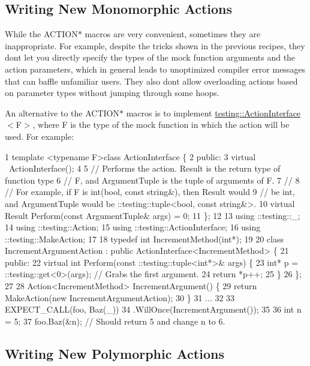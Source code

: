 \subsection*{Writing New Monomorphic Actions}

While the {\ttfamily A\+C\+T\+I\+O\+N$\ast$} macros are very convenient, sometimes they are inappropriate. For example, despite the tricks shown in the previous recipes, they don\textquotesingle{}t let you directly specify the types of the mock function arguments and the action parameters, which in general leads to unoptimized compiler error messages that can baffle unfamiliar users. They also don\textquotesingle{}t allow overloading actions based on parameter types without jumping through some hoops.

An alternative to the {\ttfamily A\+C\+T\+I\+O\+N$\ast$} macros is to implement {\ttfamily \hyperlink{classtesting_1_1_action_interface}{testing\+::\+Action\+Interface}$<$F$>$}, where {\ttfamily F} is the type of the mock function in which the action will be used. For example\+:


\begin{DoxyCode}
1 template <typename F>class ActionInterface \{
2  public:
3   virtual ~ActionInterface();
4 
5   // Performs the action.  Result is the return type of function type
6   // F, and ArgumentTuple is the tuple of arguments of F.
7   //
8   // For example, if F is int(bool, const string&), then Result would
9   // be int, and ArgumentTuple would be ::testing::tuple<bool, const string&>.
10   virtual Result Perform(const ArgumentTuple& args) = 0;
11 \};
12 
13 using ::testing::\_;
14 using ::testing::Action;
15 using ::testing::ActionInterface;
16 using ::testing::MakeAction;
17 
18 typedef int IncrementMethod(int*);
19 
20 class IncrementArgumentAction : public ActionInterface<IncrementMethod> \{
21  public:
22   virtual int Perform(const ::testing::tuple<int*>& args) \{
23     int* p = ::testing::get<0>(args);  // Grabs the first argument.
24     return *p++;
25   \}
26 \};
27 
28 Action<IncrementMethod> IncrementArgument() \{
29   return MakeAction(new IncrementArgumentAction);
30 \}
31 ...
32 
33   EXPECT\_CALL(foo, Baz(\_))
34       .WillOnce(IncrementArgument());
35 
36   int n = 5;
37   foo.Baz(&n);  // Should return 5 and change n to 6.
\end{DoxyCode}


\subsection*{Writing New Polymorphic Actions}

